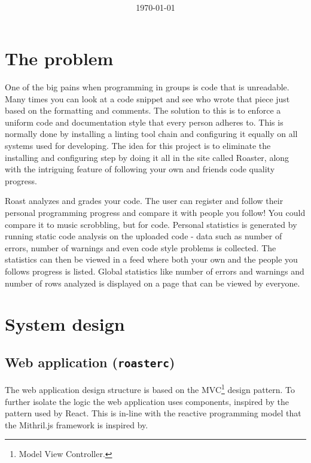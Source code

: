 \documentclass[12pt,a4paper]{report}
\title{
    \coursecode{} \\
    \coursename{} \\
    \vspace{1.8em}
    \textbf{\projectname{}} \break
    \author{
        \authorsinfo{}
    } \break{}
    \schoolinfo{}}
\date{\today}
\begin{document}
\maketitle
\thispagestyle{empty} %
\newpage

{\hypersetup{linkcolor=black}
    \tableofcontents}
\newpage

\listoftodos
{}
\newpage

\chapter{The problem}
One of the big pains when programming in groups is code that is unreadable. Many times you can look at a code snippet and see who wrote that piece
just based on the formatting and comments. The solution to this is to enforce a uniform code and documentation style that every person adheres to.
This is normally done by installing a linting tool chain and configuring it equally on all systems used for developing. 
The idea for this project is to eliminate the installing and configuring step by doing it all in the site called Roaster, along with the intriguing feature of following your own and friends code quality progress.

Roast analyzes and grades your code. The user can register and follow their personal programming progress and compare it with people you follow! 
You could compare it to music scrobbling, but for code.
Personal statistics is generated by running static code analysis on the uploaded code - data such as number of errors, number of warnings and even code style problems is collected.
The statistics can then be viewed in a feed where both your own and the people you follows progress is listed.
Global statistics like number of errors and warnings and number of rows analyzed is displayed on a page that can be viewed by everyone.
\chapter{System design}

\section{Web application (\texttt{roasterc})}
The web application design structure is based on the MVC\footnote{Model View Controller.} design pattern. To further isolate the logic the web application uses components, inspired by the pattern used by React\cite{https://reactjs.org/docs/components-and-props.html}. This is in-line with the reactive programming model that the Mithril.js framework is inspired by.
\end{document}

